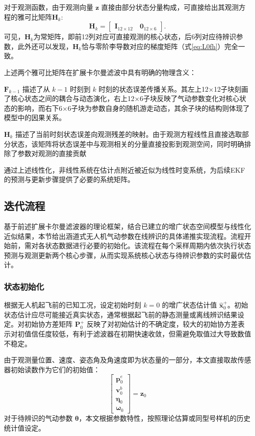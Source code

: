 对于观测函数，由于观测向量 $\bm{z}$ 直接由部分状态分量构成，可直接给出其观测方程的雅可比矩阵$\bm{H}_k$:
\begin{equation}
    \bm{H}_k = 
    \begin{bmatrix}
        \bm{I}_{12 \times 12} \quad \bm{0}_{12 \times 6}
    \end{bmatrix}.
    \label{eq:H_k}
\end{equation}
可见，$\bm{H}_k$为常矩阵，即前12列对应可直接观测的核心状态，后6列对应待辨识参数，此外还可以发现，$\bm{H}_k$恰与零阶李导数对应的梯度矩阵（式\eqref{eq:L0fh}）完全一致。

上述两个雅可比矩阵在扩展卡尔曼滤波中具有明确的物理含义：

$\bm{F}_{k-1}$ 描述了从 $k-1$ 时刻到 $k$ 时刻的状态误差传播关系。其左上12×12子块刻画了核心状态之间的耦合与动态演化，右上12×6子块反映了气动参数变化对核心状态的影响，而右下6×6子块为参数自身的随机游走动态，其余子块的结构则体现了模型中的因果关系。

$\bm{H}_k$ 描述了当前时刻状态误差向观测残差的映射。由于观测方程线性且直接选取部分状态，该矩阵将状态误差中与观测相关的分量直接投影到观测空间，同时明确排除了参数对观测的直接贡献

通过上述线性化，非线性系统在估计点附近被近似为线性时变系统，为后续EKF的预测与更新步骤提供了必要的系统矩阵。

\subsection{迭代流程}
\label{sec:diedai}
基于前述扩展卡尔曼滤波器的理论框架，结合已建立的增广状态空间模型与线性化近似结果，本节给出涵道式无人机气动参数在线辨识的具体递推实现流程。流程开始前，需对各状态数据进行必要的初始化。该流程在每个采样周期内依次执行状态预测与观测更新两个核心步骤，从而实现系统核心状态与待辨识参数的实时最优估计。

\subsubsection{状态初始化}
    根据无人机起飞前的已知工况，设定初始时刻 $k=0$ 的增广状态估计值 $\hat{\bm{x}}_0^+$。初始状态估计应尽可能接近真实状态，通常根据起飞前的静态测量或离线辨识结果设定。对初始协方差矩阵 $\bm{P}_0^+$ 反映了对初始估计的不确定度，较大的初始协方差表示对初值信任度较低，有利于滤波器在初期快速收敛，但需避免取值过大导致数值不稳定。
    
    由于观测量位置、速度、姿态角及角速度即为状态量的一部分，本文直接取故传感器初始读数作为它们的初始值：
    \begin{equation}
        \begin{bmatrix}
            \bm{p}_0^e \\
            \bm{v}_0^b \\
            \bm{\eta}_0 \\
            \bm{\omega}_0
        \end{bmatrix} = 
        \bm{z}_0
    \end{equation}
    对于待辨识的气动参数 $\bm{\theta}$，本文根据参数特性，按照理论估算或同型号样机的历史统计值设定。

